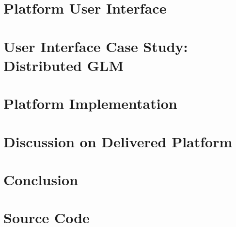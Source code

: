 \documentclass[11pt,a4paper,partial,examcopy]{aucklandthesis} %
\begin{document}
\chapter{Platform User Interface}

\chapter{User Interface Case Study: Distributed GLM}

\chapter{Platform Implementation}
\chapter{Discussion on Delivered Platform}
\chapter{Conclusion}

\appendix
\chapter{Source Code}

\printbibliography
\end{document}
